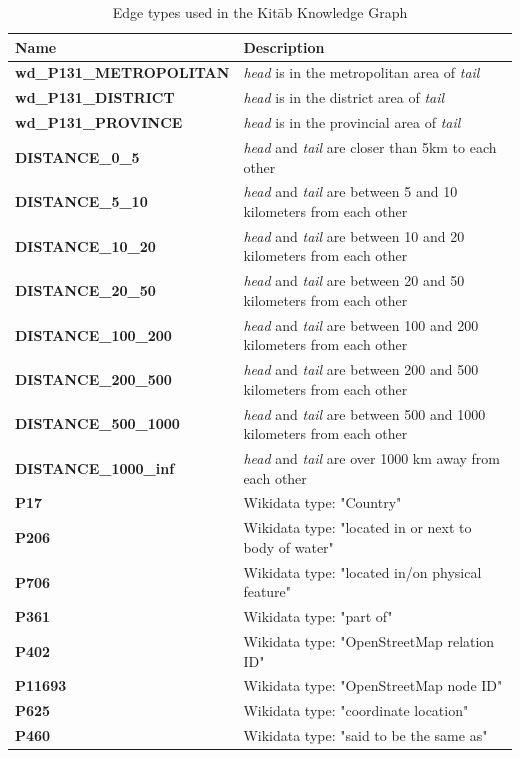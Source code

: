 \begin{table}[!ht]
    \centering
    \caption{Edge types used in the Kitāb Knowledge Graph}
    \begin{tabular}{|l|l|}
        \hline
        Name & Description \\ \hline
        \textbf{wd\_P131\_METROPOLITAN} & \textit{head} is in the metropolitan area of \textit{tail}\\ \hline
\textbf{wd\_P131\_DISTRICT} &  \textit{head} is in the district area of \textit{tail} \\ \hline
\textbf{wd\_P131\_PROVINCE} & \textit{head} is in the provincial area of \textit{tail} \\ \hline
\textbf{DISTANCE\_0\_5} & \textit{head} and \textit{tail} are closer than 5km to each other \\ \hline
\textbf{DISTANCE\_5\_10} & \textit{head} and \textit{tail} are between 5 and 10 kilometers from each other \\ \hline
\textbf{DISTANCE\_10\_20} & \textit{head} and \textit{tail} are between 10 and 20 kilometers from each other \\ \hline
\textbf{DISTANCE\_20\_50} & \textit{head} and \textit{tail} are between 20 and 50 kilometers from each other \\ \hline
\textbf{DISTANCE\_100\_200} & \textit{head} and \textit{tail} are between 100 and 200 kilometers from each other \\ \hline
\textbf{DISTANCE\_200\_500} & \textit{head} and \textit{tail} are between 200 and 500 kilometers from each other \\ \hline
\textbf{DISTANCE\_500\_1000} & \textit{head} and \textit{tail} are between 500 and 1000 kilometers from each other \\ \hline
\textbf{DISTANCE\_1000\_inf} & \textit{head} and \textit{tail} are over 1000 km away from each other \\ \hline
\textbf{P17} & Wikidata type: "Country" \\ \hline
\textbf{P206} & Wikidata type: "located in or next to body of water" \\ \hline
\textbf{P706} & Wikidata type: "located in/on physical feature" \\ \hline
\textbf{P361} & Wikidata type:  "part of" \\ \hline
\textbf{P402} & Wikidata type: "OpenStreetMap relation ID" \\ \hline
\textbf{P11693} & Wikidata type:  "OpenStreetMap node ID" \\ \hline
\textbf{P625} & Wikidata type: "coordinate location" \\ \hline
\textbf{P460} & Wikidata type: "said to be the same as" \\ \hline
\end{tabular}
\label{tab:kg-edges}
\end{table}